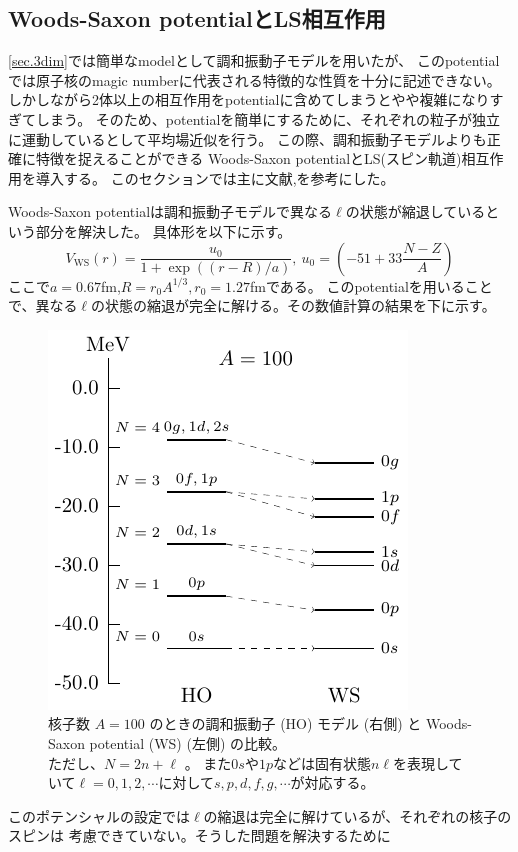 \documentclass[a4paper]{jsarticle}
\begin{document}
\subsection{Woods-Saxon potentialとLS相互作用}\label{sec.ws}
\ref{sec.3dim}では簡単なmodelとして調和振動子モデルを用いたが、
このpotentialでは原子核のmagic numberに代表される特徴的な性質を十分に記述できない。
しかしながら2体以上の相互作用をpotentialに含めてしまうとやや複雑になりすぎてしまう。
そのため、potentialを簡単にするために、それぞれの粒子が独立に運動しているとして平均場近似を行う。
この際、調和振動子モデルよりも正確に特徴を捉えることができる
Woods-Saxon potentialとLS(スピン軌道)相互作用を導入する。
このセクションでは主に文献\cite{nucleus_structure},\cite{nucleus.pdf}を参考にした。\par
Woods-Saxon potentialは調和振動子モデルで異なる$\ell$の状態が縮退しているという部分を解決した。
具体形を以下に示す。
\begin{equation}
  V_{\text{WS}}(r)=\dfrac{u_{0}}{1+\exp((r-R)/a)},\ u_{0}=\left(-51+33\dfrac{N-Z}{A}\right)
  \label{WSpt}
\end{equation}
ここで$a=0.67$fm,$R=r_0A^{1/3},r_0=1.27$fmである。
このpotentialを用いることで、異なる$\ell$の状態の縮退が完全に解ける。その数値計算の結果を下に示す。
\begin{figure}[H]
  \centering
  \includegraphics[width=.5\textwidth]{main_fig/HOvsWS.pdf}
  \captionsetup{width=0.8\textwidth}
  \caption{核子数 $A=100$ のときの調和振動子 (HO) モデル (右側) と 
  Woods-Saxon potential (WS) (左側) の比較。\\
  ただし、$N = 2n + \ell$ 。
  また$0s$や$1p$などは固有状態$n\ell$を表現していて$\ell=0,1,2,\cdots$に対して$s,p,d,f,g,\cdots$が対応する。}
  \label{fig:HOvsWS}
\end{figure}
このポテンシャルの設定では$\ell$の縮退は完全に解けているが、それぞれの核子のスピンは
考慮できていない。そうした問題を解決するために
\end{document}
